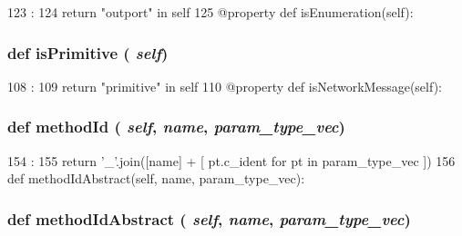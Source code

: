 \begin{DoxyCode}
123                        :
124         return "outport" in self
125     @property
    def isEnumeration(self):
\end{DoxyCode}
\hypertarget{classslicc_1_1symbols_1_1Type_1_1Type_a45a24d63484ab10bacd544457ba77ecb}{
\subsubsection[{isPrimitive}]{\setlength{\rightskip}{0pt plus 5cm}def isPrimitive ( {\em self})}}
\label{classslicc_1_1symbols_1_1Type_1_1Type_a45a24d63484ab10bacd544457ba77ecb}



\begin{DoxyCode}
108                          :
109         return "primitive" in self
110     @property
    def isNetworkMessage(self):
\end{DoxyCode}
\hypertarget{classslicc_1_1symbols_1_1Type_1_1Type_a4ce953072a7b02c852dbd0346bcc6c68}{
\subsubsection[{methodId}]{\setlength{\rightskip}{0pt plus 5cm}def methodId ( {\em self}, \/   {\em name}, \/   {\em param\_\-type\_\-vec})}}
\label{classslicc_1_1symbols_1_1Type_1_1Type_a4ce953072a7b02c852dbd0346bcc6c68}



\begin{DoxyCode}
154                                             :
155         return '_'.join([name] + [ pt.c_ident for pt in param_type_vec ])
156 
    def methodIdAbstract(self, name, param_type_vec):
\end{DoxyCode}
\hypertarget{classslicc_1_1symbols_1_1Type_1_1Type_ac0ea819ac12c659bd705db3a351250b9}{
\subsubsection[{methodIdAbstract}]{\setlength{\rightskip}{0pt plus 5cm}def methodIdAbstract ( {\em self}, \/   {\em name}, \/   {\em param\_\-type\_\-vec})}}
\label{classslicc_1_1symbols_1_1Type_1_1Type_ac0ea819ac12c659bd705db3a351250b9}



